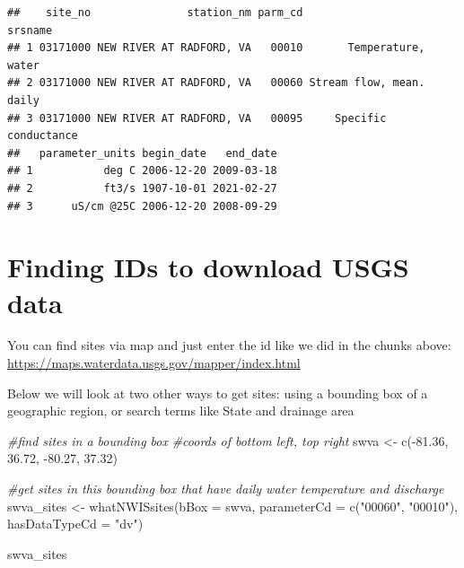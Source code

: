 \documentclass[
]{book}
\newenvironment{Shaded}{\begin{snugshade}}{\end{snugshade}}
\newcommand{\AttributeTok}[1]{\textcolor[rgb]{0.77,0.63,0.00}{#1}}
\newcommand{\CommentTok}[1]{\textcolor[rgb]{0.56,0.35,0.01}{\textit{#1}}}
\newcommand{\FloatTok}[1]{\textcolor[rgb]{0.00,0.00,0.81}{#1}}
\newcommand{\FunctionTok}[1]{\textcolor[rgb]{0.00,0.00,0.00}{#1}}
\newcommand{\NormalTok}[1]{#1}
\newcommand{\OtherTok}[1]{\textcolor[rgb]{0.56,0.35,0.01}{#1}}
\newcommand{\SpecialCharTok}[1]{\textcolor[rgb]{0.00,0.00,0.00}{#1}}
\newcommand{\StringTok}[1]{\textcolor[rgb]{0.31,0.60,0.02}{#1}}
\begin{document}
\begin{verbatim}
##    site_no               station_nm parm_cd                  srsname
## 1 03171000 NEW RIVER AT RADFORD, VA   00010       Temperature, water
## 2 03171000 NEW RIVER AT RADFORD, VA   00060 Stream flow, mean. daily
## 3 03171000 NEW RIVER AT RADFORD, VA   00095     Specific conductance
##   parameter_units begin_date   end_date
## 1           deg C 2006-12-20 2009-03-18
## 2           ft3/s 1907-10-01 2021-02-27
## 3      uS/cm @25C 2006-12-20 2008-09-29
\end{verbatim}

\hypertarget{finding-ids-to-download-usgs-data}{%
\section{Finding IDs to download USGS data}\label{finding-ids-to-download-usgs-data}}

You can find sites via map and just enter the id like we did in the chunks above: \url{https://maps.waterdata.usgs.gov/mapper/index.html}

Below we will look at two other ways to get sites: using a bounding box of a geographic region, or search terms like State and drainage area

\begin{Shaded}
\begin{Highlighting}[]
\CommentTok{\#find sites in a bounding box}
\CommentTok{\#coords of bottom left, top right}
\NormalTok{swva }\OtherTok{\textless{}{-}} \FunctionTok{c}\NormalTok{(}\SpecialCharTok{{-}}\FloatTok{81.36}\NormalTok{, }\FloatTok{36.72}\NormalTok{, }\SpecialCharTok{{-}}\FloatTok{80.27}\NormalTok{, }\FloatTok{37.32}\NormalTok{)}

\CommentTok{\#get sites in this bounding box that have daily water temperature and discharge}
\NormalTok{swva\_sites }\OtherTok{\textless{}{-}} \FunctionTok{whatNWISsites}\NormalTok{(}\AttributeTok{bBox =}\NormalTok{ swva, }
                            \AttributeTok{parameterCd =} \FunctionTok{c}\NormalTok{(}\StringTok{"00060"}\NormalTok{, }\StringTok{"00010"}\NormalTok{), }
                            \AttributeTok{hasDataTypeCd =} \StringTok{"dv"}\NormalTok{)}

\NormalTok{swva\_sites}
\end{Highlighting}
\end{Shaded}
\end{document}
